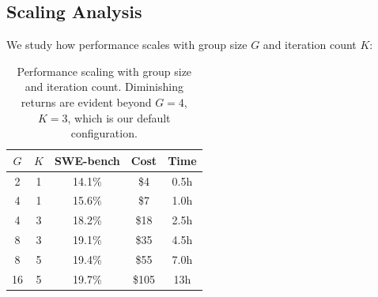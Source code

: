 \subsection{Scaling Analysis}

We study how performance scales with group size $G$ and iteration count $K$:

\begin{table}[h]
\centering
\begin{tabular}{ccccc}
\toprule
$G$ & $K$ & SWE-bench & Cost & Time \\
\midrule
2 & 1 & 14.1\% & \$4 & 0.5h \\
4 & 1 & 15.6\% & \$7 & 1.0h \\
4 & 3 & 18.2\% & \$18 & 2.5h \\
8 & 3 & 19.1\% & \$35 & 4.5h \\
8 & 5 & 19.4\% & \$55 & 7.0h \\
16 & 5 & 19.7\% & \$105 & 13h \\
\bottomrule
\end{tabular}
\caption{Performance scaling with group size and iteration count. Diminishing
returns are evident beyond $G=4$, $K=3$, which is our default configuration.}
\label{tab:scaling}
\end{table}

